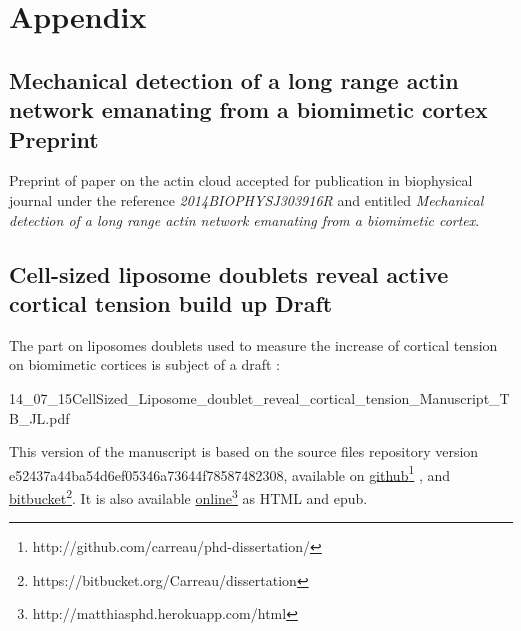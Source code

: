 \documentclass[A4paperpaper,11pt,english]{sphinxmanual}
\begin{document}
\chapter{Appendix}
\label{index-latex:appendix}\label{index-latex::doc}

\section{Mechanical detection of a long range actin network emanating from a biomimetic cortex Preprint}
\label{index-latex:mechanical-detection-of-a-long-range-actin-network-emanating-from-a-biomimetic-cortex-preprint}
Preprint of paper on the actin cloud accepted for publication in biophysical
journal under the reference \emph{2014BIOPHYSJ303916R} and entitled \emph{Mechanical
detection of a long range actin network emanating from a biomimetic cortex}.



\section{Cell-sized liposome doublets reveal active cortical tension build up Draft}
\label{index-latex:cell-sized-liposome-doublets-reveal-active-cortical-tension-build-up-draft}
The part on liposomes doublets used to measure the increase of cortical tension
on biomimetic cortices is subject of a draft :

{14_07_15CellSized_Liposome_doublet_reveal_cortical_tension_Manuscript_TB_JL.pdf}


This version of the manuscript is based on the source files repository version
e52437a44ba54d6ef05346a73644f78587482308, available on \href{http://github.com/carreau/phd-dissertation/}{github}\footnote{http://github.com/carreau/phd-dissertation/}
, and \href{https://bitbucket.org/Carreau/dissertation}{bitbucket}\footnote{https://bitbucket.org/Carreau/dissertation}. It is also available \href{http://matthiasphd.herokuapp.com/html}{online}\footnote{http://matthiasphd.herokuapp.com/html} as HTML and epub.
\end{document}
